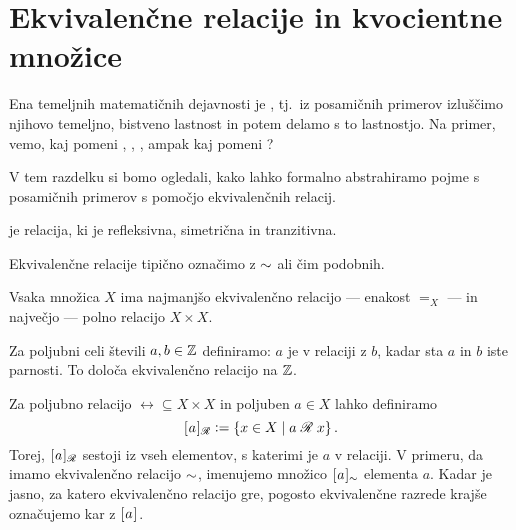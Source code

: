 		
	
	
	\section{Ekvivalenčne relacije in kvocientne množice}
	
		Ena temeljnih matematičnih dejavnosti je  , tj.~iz posamičnih primerov izluščimo njihovo temeljno, bistveno lastnost in potem delamo s to lastnostjo.  Na primer, vemo, kaj pomeni , , , ampak kaj pomeni ?
		
		V tem razdelku si bomo ogledali, kako lahko formalno abstrahiramo pojme s posamičnih primerov s pomočjo ekvivalenčnih relacij.
		
		\begin{definicija}
			 je relacija, ki je refleksivna, simetrična in tranzitivna.
		\end{definicija}
		
		Ekvivalenčne relacije tipično označimo z $\equ$ ali čim podobnih.
		
		\begin{zgled}
			Vsaka množica $X$ ima najmanjšo ekvivalenčno relacijo --- enakost $=_X$ --- in največjo --- polno relacijo $X \times X$.
		\end{zgled}
		
		\begin{zgled}
			Za poljubni celi števili $a, b \in \ZZ$ definiramo: $a$ je v relaciji z $b$, kadar sta $a$ in $b$ iste parnosti. To določa ekvivalenčno relacijo na $\ZZ$.
		\end{zgled}
		
		Za poljubno relacijo $\rel \subseteq X \times X$ in poljuben $a \in X$ lahko definiramo
		\[\ec[\rel]{a} \dfeq \set{x \in X}{\rel[a][x]}.\]
		Torej, $\ec[\rel]{a}$ sestoji iz vseh elementov, s katerimi je $a$ v relaciji. V primeru, da imamo ekvivalenčno relacijo $\equ$, imenujemo množico $\ec[\equ]{a}$  elementa $a$. Kadar je jasno, za katero ekvivalenčno relacijo gre, pogosto ekvivalenčne razrede krajše označujemo kar z $\ec{a}$.
		
